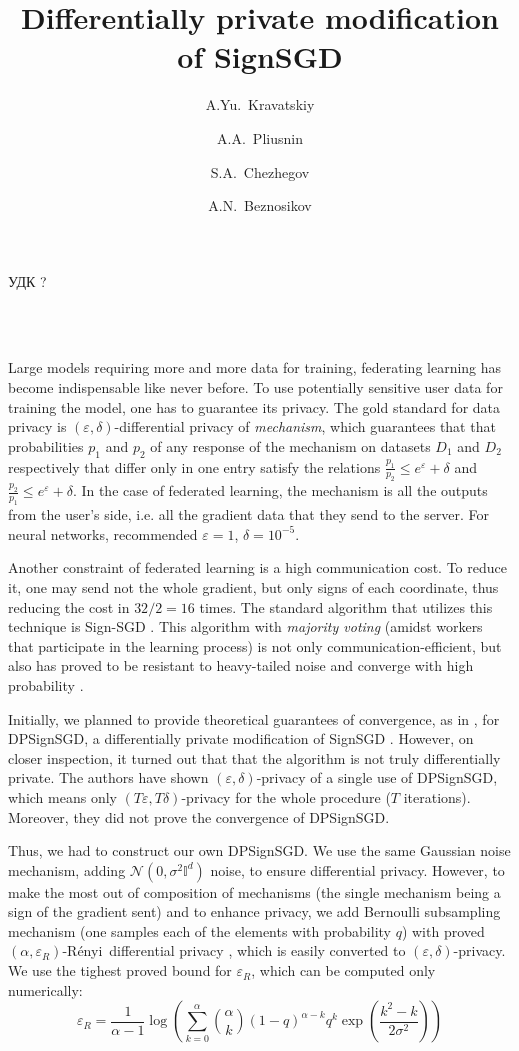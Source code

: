 \documentclass[a4paper, 12pt]{article}
\title{\textbf{Differentially private modification of SignSGD}}
\author[]{A.Yu.~Kravatskiy}
\author[]{A.A.~Pliusnin}
\author[]{S.A.~Chezhegov}
\author[]{A.N.~Beznosikov}
\affil[]{Moscow Institute of Physics and Technology}
\date{} %
\makeatletter
\renewcommand\maketitle{\par
  \begingroup
    \renewcommand\thefootnote{\@fnsymbol\c@footnote}%
    \def\@makefnmark{\rlap{\@textsuperscript{\normalfont\@thefnmark}}}%
    \long\def\@makefntext##1{\parindent 1em\noindent
            \hb@xt@1.8em{%
                \hss\@textsuperscript{\normalfont\@thefnmark}}##1}%
    \if@twocolumn
      \ifnum \col@number=\@ne
        \@maketitle
      \else
        \twocolumn[\@maketitle]%
      \fi
    \else
      \newpage
      \global\@topnum\z@
      \@maketitle
    \fi
    \thispagestyle{empty}\@thanks
  \endgroup
  \setcounter{footnote}{0}%
  \global\let\thanks\relax
  \global\let\maketitle\relax
  \global\let\@maketitle\relax
  \global\let\@thanks\@empty
  \global\let\@author\@empty
  \global\let\@date\@empty
  \global\let\@title\@empty
  \global\let\title\relax
  \global\let\author\relax
  \global\let\date\relax
  \global\let\and\relax
}
\renewcommand{\maketitle}{
  \begin{center}
    \fontsize{15}{12}\selectfont
    \textbf{\@title} \\
    \vspace{0.5em}
    \@author \\
    \vspace{0.5em}
    \@date
  \end{center}
  \vspace{-0.5em}
}
\newcommand{\eps}{\varepsilon}
\newcommand{\renyi}{R\'enyi}
\makeatother
\begin{document}
\noindent\foreignlanguage{russian}{УДК ?}\vspace{-2em}
\maketitle
Large models requiring more and more data for training, federating learning has become indispensable like never before. To use potentially sensitive user data for training the model, one has to guarantee its privacy. The gold standard for data privacy is $(\eps, \delta)$-differential privacy \cite{Dwork2014} of \emph{mechanism}, which guarantees that that probabilities $p_1$ and $p_2$ of any response of the mechanism on datasets $D_1$ and $D_2$ respectively that differ only in one entry satisfy the relations $\frac{p_1}{p_2} \leq e^{\eps} + \delta$ and $\frac{p_2}{p_1} \leq e^{\eps} + \delta$. In the case of federated learning, the mechanism is all the outputs from the user's side, i.e. all the gradient data that they send to the server. For neural networks, recommended $\eps = 1$, $\delta = 10^{-5}$. 

Another constraint of federated learning is a high communication cost. To reduce it, one may send not the whole gradient, but only signs of each coordinate, thus reducing the cost in $32/2 = 16$ times. The standard algorithm that utilizes this technique is Sign-SGD \cite{Bernstein2018}. This algorithm with \emph{majority voting} (amidst workers that participate in the learning process) is not only communication-efficient, but also has proved to be resistant to heavy-tailed noise and converge with high probability \cite{Kornilov2025}.

Initially, we planned to provide theoretical guarantees of convergence, as in \cite{Kornilov2025}, for DPSignSGD, a differentially private modification of SignSGD \cite{Jin2020}. However, on closer inspection, it turned out that that the algorithm is not truly differentially private. The authors have shown $(\eps, \delta)$-privacy of a single use of DPSignSGD, which means only $(T\eps, T\delta)$-privacy for the whole procedure ($T$ iterations). Moreover, they did not prove the convergence of DPSignSGD.

Thus, we had to construct our own DPSignSGD. We use the same Gaussian noise mechanism, adding $\mathcal{N}(0,\sigma^2\mathbb{I}^d)$ noise, to ensure differential privacy. However, to make the most out of composition of mechanisms (the single mechanism being a sign of the gradient sent) and to enhance privacy, we add Bernoulli subsampling mechanism (one samples each of the elements with probability $q$) with proved $(\alpha, \eps_R)$-\renyi\ differential privacy \cite{mironov2019SGM}, which is easily converted to $(\eps, \delta)$-privacy. We use the tighest proved bound for $\eps_R$, which can be computed only numerically:
\begin{equation}\label{eq:renyi_eps_guarantee}
\eps_R = \frac{1}{\alpha - 1} \log\left(\sum_{k=0}^{\alpha} {\alpha \choose k}  (1-q)^{\alpha-k}q^{k} \exp\left(\frac{k^2 - k}{2\sigma^2}\right)\right)
\end{equation}
\end{document}
